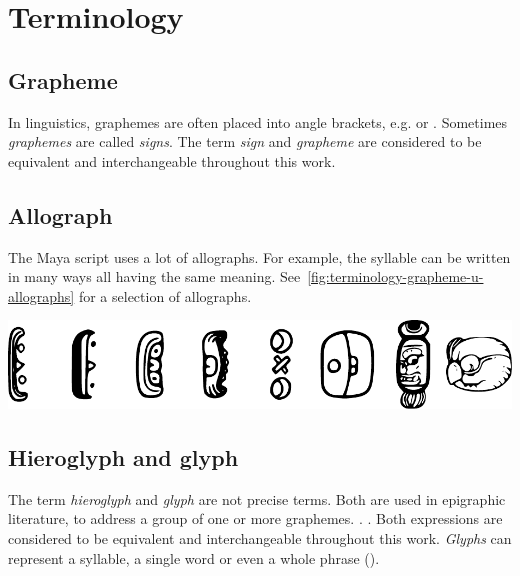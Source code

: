 \documentclass[../main.tex]{subfiles}
\begin{document}
\chapter{Terminology}

\section{Grapheme}
In linguistics, graphemes are often placed into angle brackets, e.g.  or .
Sometimes \emph{graphemes} are called \emph{signs}.
The term \emph{sign} and \emph{grapheme} are considered to be equivalent and 
interchangeable throughout this work.

\section{Allograph}
The Maya script uses a lot of allographs.
For example, the syllable  can be written in many ways all having the same meaning.
See~\ref{fig:terminology-grapheme-u-allographs} for a selection of allographs.
\begin{center}
    \includegraphics[width=\textwidth,keepaspectratio]{img/grapheme-u-allographs}
    \label{fig:terminology-grapheme-u-allographs}
\end{center}

\section{Hieroglyph and glyph}
The term \emph{hieroglyph} and \emph{glyph} are not precise terms.
Both are used in epigraphic literature, to address a group of one or more graphemes.
.
. 
Both expressions are considered to be equivalent and interchangeable throughout this work.
\emph{Glyphs} can represent a syllable, a single word or even a whole phrase 
(\cite[23]{macrilooper2003}).
\end{document}
